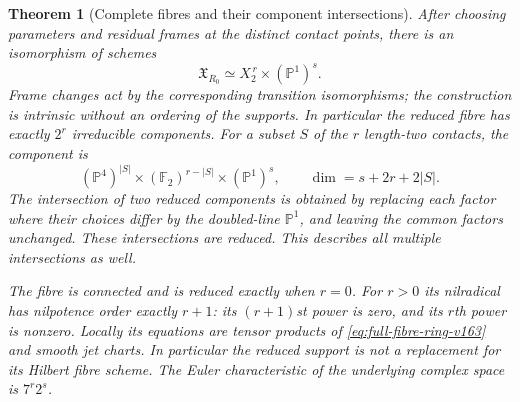 \documentclass[11pt,reqno]{amsart}
\numberwithin{equation}{section}
\newtheorem{theorem}{Theorem}[section]
\theoremstyle{definition}\newtheorem{definition}[theorem]{Definition}
\theoremstyle{remark}\newtheorem{remark}[theorem]{Remark}
\newcommand{\Pj}{\mathbb P}\newcommand{\A}{\mathbb A}
\begin{document}
\begin{theorem}[Complete fibres and their component intersections]
\label{thm:product-fibres-v163}
After choosing parameters and residual frames at the distinct contact
points, there is an isomorphism of schemes
\begin{equation}\label{eq:product-fibres-v163}
              \mathfrak X_{R_0}\simeq X_2^{\,r}\times(\Pj^1)^s.
\end{equation}
Frame changes act by the corresponding transition isomorphisms; the
construction is intrinsic without an ordering of the supports.
In particular the reduced fibre has exactly $2^r$ irreducible
components. For a subset $S$ of the $r$ length-two contacts, the
component is
\begin{equation}\label{eq:component-product-v163}
 (\Pj^4)^{|S|}\times(\mathbb F_2)^{r-|S|}\times(\Pj^1)^s,
 \qquad \dim=s+2r+2|S|.
\end{equation}
The intersection of two reduced components is obtained by replacing
each factor where their choices differ by the doubled-line
$\Pj^1$, and leaving the common factors unchanged. These intersections
are reduced. This describes all multiple intersections as well.

The fibre is connected and is reduced exactly when $r=0$. For $r>0$
its nilradical has nilpotence order exactly $r+1$: its $(r+1)$st
power is zero, and its $r$th power is nonzero. Locally its equations
are tensor products of \eqref{eq:full-fibre-ring-v163} and smooth
jet charts. In particular the reduced support is not a replacement
for its Hilbert fibre scheme. The Euler characteristic of the
underlying complex space is $7^r2^s$.
\end{theorem}
\end{document}
